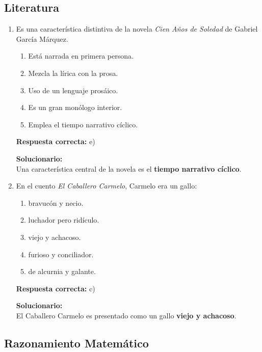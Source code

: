 \subsection*{Literatura}

\begin{enumerate}
	
	\item Es una característica distintiva de la novela \textit{Cien Años de Soledad} de Gabriel García Márquez.
	\begin{enumerate}[label=\alph*)]
		\item Está narrada en primera persona.
		\item Mezcla la lírica con la prosa.
		\item Uso de un lenguaje prosáico.
		\item Es un gran monólogo interior.
		\item Emplea el tiempo narrativo cíclico.
	\end{enumerate}
	\textbf{Respuesta correcta:} e)
	
	\vspace{2mm}
	\textbf{Solucionario:}\\
	Una característica central de la novela es el \textbf{tiempo narrativo cíclico}.
	
	\vspace{6mm}
	
	\item En el cuento \textit{El Caballero Carmelo}, Carmelo era un gallo:
	\begin{enumerate}[label=\alph*)]
		\item bravucón y necio.
		\item luchador pero ridículo.
		\item viejo y achacoso.
		\item furioso y conciliador.
		\item de alcurnia y galante.
	\end{enumerate}
	\textbf{Respuesta correcta:} c)
	
	\vspace{2mm}
	\textbf{Solucionario:}\\
	El Caballero Carmelo es presentado como un gallo \textbf{viejo y achacoso}.
	
	\vspace{6mm}
	
\end{enumerate}

\subsection*{Razonamiento Matemático}

